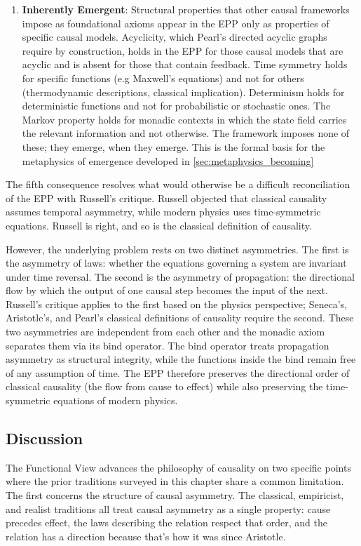 \begin{enumerate}
\item \textbf{Inherently Emergent}: Structural properties that other
causal frameworks impose as foundational axioms appear in the EPP only
as properties of specific causal models. Acyclicity, which Pearl's directed acyclic graphs require by construction, holds in the EPP for those causal models that are acyclic
and is absent for those that contain feedback. Time symmetry holds for
specific functions (e.g Maxwell's equations) and not
for others (thermodynamic descriptions, classical implication).
Determinism holds for deterministic functions and not for probabilistic
or stochastic ones. The Markov property holds for monadic contexts in
which the state field carries the relevant information and not
otherwise. The framework imposes none of these; they emerge, when they
emerge.  This is the formal basis for the metaphysics of emergence developed in \ref{sec:metaphysics_becoming}
\end{enumerate}

The fifth consequence resolves what would otherwise be a difficult
reconciliation of the EPP with Russell's critique. Russell objected that
classical causality assumes temporal asymmetry, while modern physics uses
time-symmetric equations. Russell is right, and so is the classical definition of causality.  

However, the underlying problem rests on two distinct asymmetries. The first is the asymmetry of laws: whether the equations governing a system are invariant under time reversal. The second is the asymmetry of propagation: the directional flow by which the output of one causal step becomes the input of the next. Russell's critique applies to the first based on the physics perspective; Seneca's, Aristotle's, and Pearl's classical definitions of causality require the second. These two asymmetries are independent from each other and the  monadic axiom separates them via its bind operator. The bind operator treats propagation asymmetry as structural integrity, while the functions inside the bind remain free of any assumption of time. The EPP
therefore preserves the directional order of classical causality (the flow from cause to effect) while also preserving the time-symmetric equations of modern physics. 
 
\subsection{Discussion}
\label{sec:philosophy_discussion} 

The Functional View advances the philosophy of causality on two specific points where the prior traditions surveyed in this chapter share a common limitation. The first concerns the structure of causal asymmetry. The classical, empiricist, and realist traditions all treat causal asymmetry as a single property: cause precedes effect, the laws describing the relation respect that order, and the relation has a direction because that's how it was since Aristotle. 


